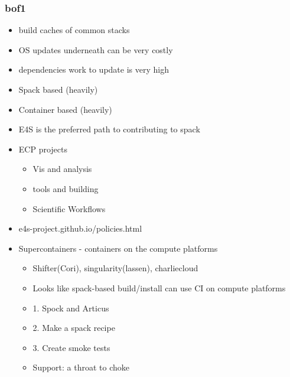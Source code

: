 \begin{frame}\frametitle{bof1}
\begin{itemize}
\item build caches of common stacks
\item OS updates underneath can be very costly
\item dependencies work to update is very high
\item Spack based (heavily)
\item Container based (heavily)
\item E4S is the preferred path to contributing to spack
\item ECP projects
\begin{itemize}
\item Vis and analysis
\item tools and building
\item Scientific Workflows 
\end{itemize}
\item e4s-project.github.io/policies.html
\item Supercontainers - containers on the compute platforms
\begin{itemize}
\item Shifter(Cori), singularity(lassen), charliecloud
\item Looks like spack-based build/install can use CI on compute platforms
\item 1. Spock and Articus
\item 2. Make a spack recipe
\item 3. Create smoke tests
\item Support: a throat to choke
\end{itemize}
\end{itemize}
\end{frame}


